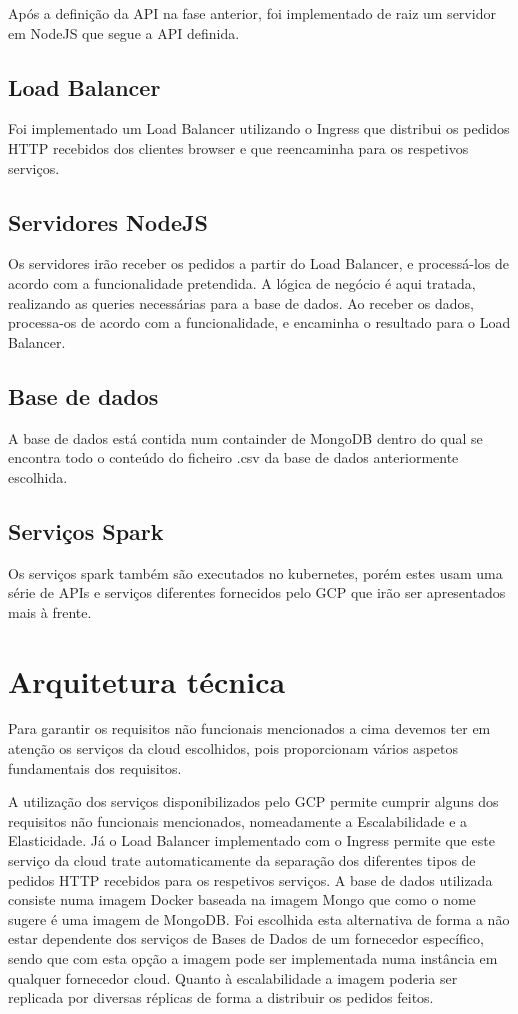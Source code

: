 \documentclass[11pt,a4paper]{article}
\begin{document}
Após a definição da API na fase anterior, foi implementado de raiz um servidor em NodeJS que segue a API definida.


\subsection{Load Balancer}
Foi implementado um Load Balancer utilizando o Ingress que distribui os pedidos HTTP recebidos dos clientes browser e que reencaminha para os respetivos serviços.

\subsection{Servidores NodeJS}
Os servidores irão receber os pedidos a partir do Load Balancer, e processá-los de acordo com a funcionalidade pretendida. A lógica de negócio é aqui tratada, realizando as queries necessárias para a base de dados. Ao receber os dados, processa-os de acordo com a funcionalidade, e encaminha o resultado para o Load Balancer.

\subsection{Base de dados}
A base de dados está contida num containder de MongoDB dentro do qual se encontra todo o conteúdo do ficheiro .csv da base de dados anteriormente escolhida.

\subsection{Serviços Spark}
Os serviços spark também são executados no kubernetes, porém estes usam uma série de APIs e serviços diferentes fornecidos pelo GCP que irão ser apresentados mais à frente.

\section{Arquitetura técnica}
Para garantir os requisitos não funcionais mencionados a cima devemos ter em atenção os serviços da cloud escolhidos, pois proporcionam vários aspetos fundamentais dos requisitos.
\newline

A utilização dos serviços disponibilizados pelo GCP permite cumprir alguns dos requisitos não funcionais mencionados, nomeadamente a Escalabilidade e a Elasticidade. Já o Load Balancer implementado com o Ingress permite que este serviço da cloud trate automaticamente da separação dos diferentes tipos de pedidos HTTP recebidos para os respetivos serviços. A base de dados utilizada consiste numa imagem Docker baseada na imagem Mongo que como o nome sugere é uma imagem de MongoDB. Foi escolhida esta alternativa de forma a não estar dependente dos serviços de Bases de Dados de um fornecedor específico, sendo que com esta opção a imagem pode ser implementada numa instância em qualquer fornecedor cloud. Quanto à escalabilidade a imagem poderia ser replicada por diversas réplicas de forma a distribuir os pedidos feitos.
\newline
\end{document}
